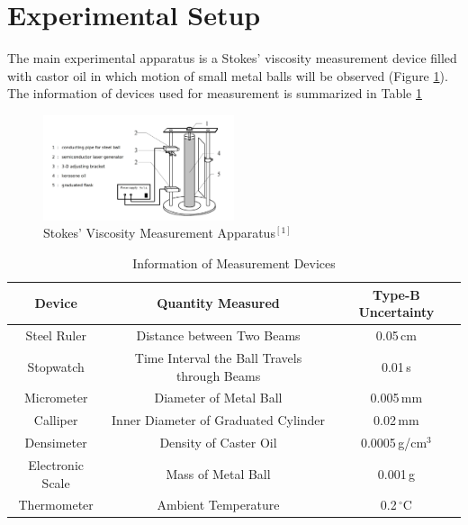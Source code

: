 \documentclass[a4paper]{article}
\begin{document}
		\section{Experimental Setup}
The main experimental apparatus is a Stokes' viscosity measurement device filled with castor oil in which motion of small metal balls will be observed (Figure \ref{Fig.apparatus}). The information of devices used for measurement is summarized in Table \ref{Tab.apparatus}

\begin{figure}[htbp]
\centering
\includegraphics[width=0.5\textwidth]{Apparatus.png}
\caption{Stokes' Viscosity Measurement Apparatus$^{[1]}$}\label{Fig.apparatus}
\end{figure}

\begin{table}[htbp]
\begin{center}
\begin{tabular}{ccc}
\toprule
Device & Quantity Measured & Type-B Uncertainty \\
\midrule
Steel Ruler& Distance between Two Beams & 0.05\,cm\\
Stopwatch& Time Interval the Ball Travels through Beams &0.01\,s\\
Micrometer& Diameter of Metal Ball &  0.005\,mm\\
Calliper& Inner Diameter of Graduated Cylinder & 0.02\,mm\\
Densimeter& Density of Caster Oil &  0.0005\,g/cm$^{3} $\\
Electronic Scale& Mass of Metal Ball &  0.001\,g\\
Thermometer& Ambient Temperature &  0.2\,$^\circ$C\\

\bottomrule
\end{tabular}
\end{center}
\caption{Information of Measurement Devices}\label{Tab.apparatus}
\end{table}
\end{document}
